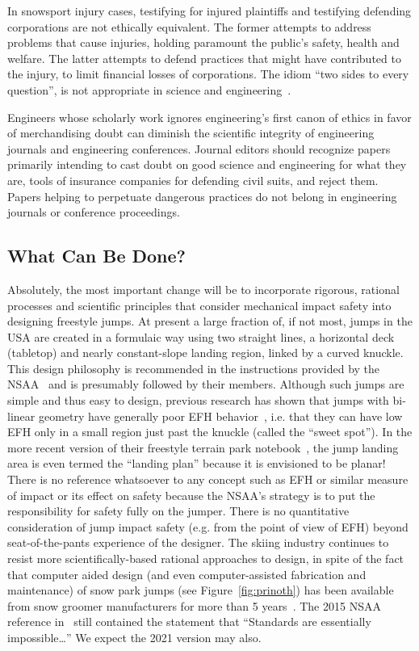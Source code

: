 \documentclass[smallextended]{svjour3}       %
\begin{document}
In snowsport injury cases, testifying for injured plaintiffs and testifying defending
corporations are not ethically equivalent. The former attempts to address
problems that cause injuries, holding paramount the public's safety, health and
welfare. The latter attempts to defend practices that might have contributed to
the injury, to limit financial losses of corporations. The idiom ``two sides to
every question'', is not appropriate in science and engineering~\cite[page
268]{Oreskes2010}.

Engineers whose scholarly work ignores engineering's first canon of ethics in
favor of merchandising doubt can diminish the scientific integrity of
engineering journals and engineering conferences. Journal editors should
recognize papers primarily intending to cast doubt on good science and
engineering for what they are, tools of insurance companies for defending civil
suits, and reject them. Papers helping to perpetuate dangerous practices do not
belong in engineering journals or conference proceedings.

\subsection{What Can Be Done?}
\label{sec:action}
%
Absolutely, the most important change will be to incorporate rigorous,
rational  processes and scientific principles that consider mechanical impact safety into designing freestyle jumps.
At present a large fraction of, if not most, jumps in the USA are created in a
formulaic way using two straight lines, a horizontal deck (tabletop) and nearly
constant-slope landing region, linked by a curved knuckle. This design philosophy is recommended in the instructions provided by the NSAA~\cite{NSAA2015} and is presumably followed by their members. Although such jumps are
simple and thus easy to design, previous research has shown that jumps with
bi-linear geometry have generally poor EFH behavior~\cite{Swedberg2012}, i.e. that they can have low EFH only in a small region just past the knuckle (called the ``sweet spot''). In the more recent version of their freestyle terrain park notebook~\cite{NSAA2015}, the jump landing area is even termed the ``landing plan'' because it is envisioned to be planar! There is no reference whatsoever to any concept such as EFH or similar measure of impact or its effect on safety because the NSAA's strategy is to put the responsibility for safety fully on the jumper. There is no
quantitative consideration of jump impact safety (e.g. from the point of view of EFH)
beyond seat-of-the-pants experience of the designer. The
skiing industry continues to resist more scientifically-based rational approaches to design, in spite of the fact that computer aided design (and even computer-assisted fabrication and maintenance) of snow park jumps (see
Figure~\ref{fig:prinoth}) has been available from snow groomer manufacturers
for more than 5 years~\cite{Muigg2019}. The 2015 NSAA reference in~\cite{NSAA2015} still contained the statement that ``Standards are essentially impossible\ldots'' We expect the 2021 version may also.
\end{document}
